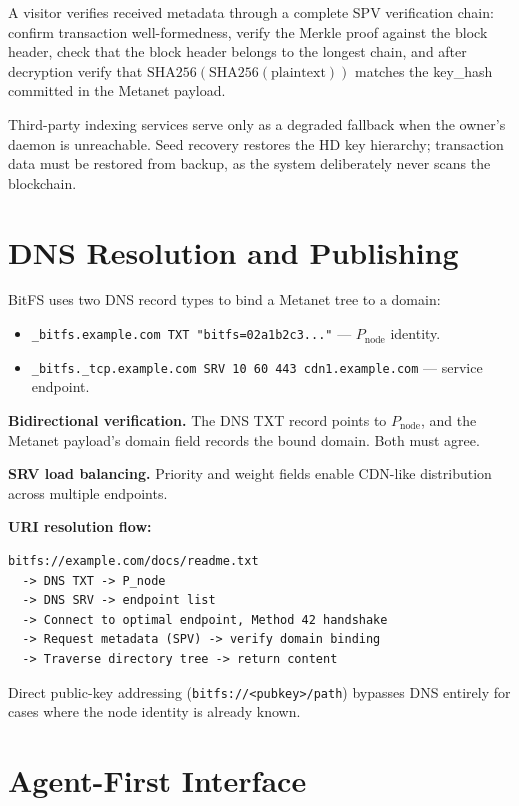 \documentclass[11pt,a4paper]{article}
\begin{document}
A visitor verifies received metadata through a complete SPV verification chain: confirm transaction well-formedness, verify the Merkle proof against the block header, check that the block header belongs to the longest chain, and after decryption verify that $\text{SHA256}(\text{SHA256}(\text{plaintext}))$ matches the key\_hash committed in the Metanet payload.

Third-party indexing services serve only as a degraded fallback when the owner's daemon is unreachable. Seed recovery restores the HD key hierarchy; transaction data must be restored from backup, as the system deliberately never scans the blockchain.

\section{DNS Resolution and Publishing}

BitFS uses two DNS record types to bind a Metanet tree to a domain:

\begin{itemize}
\item \texttt{\_bitfs.example.com TXT "bitfs=02a1b2c3..."} --- $P_{\text{node}}$ identity.
\item \texttt{\_bitfs.\_tcp.example.com SRV 10 60 443 cdn1.example.com} --- service endpoint.
\end{itemize}

\textbf{Bidirectional verification.} The DNS TXT record points to $P_{\text{node}}$, and the Metanet payload's domain field records the bound domain. Both must agree.

\textbf{SRV load balancing.} Priority and weight fields enable CDN-like distribution across multiple endpoints.

\textbf{URI resolution flow:}

\begin{lstlisting}
bitfs://example.com/docs/readme.txt
  -> DNS TXT -> P_node
  -> DNS SRV -> endpoint list
  -> Connect to optimal endpoint, Method 42 handshake
  -> Request metadata (SPV) -> verify domain binding
  -> Traverse directory tree -> return content
\end{lstlisting}

Direct public-key addressing (\texttt{bitfs://<pubkey>/path}) bypasses DNS entirely for cases where the node identity is already known.

\section{Agent-First Interface}
\end{document}
